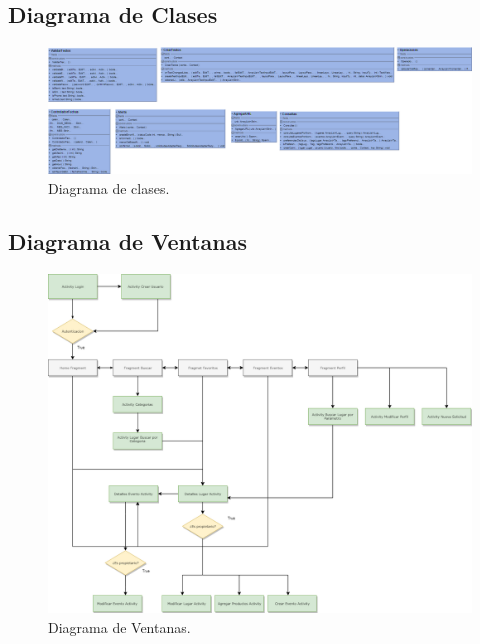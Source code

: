 \documentclass[12pt,letterpaper,openany]{book}
\begin{document}
\subsection{Diagrama de Clases}
\begin{figure}[H]
\begin{center}
\includegraphics[width=16cm]{./imagenes/diagrama_clases}
\caption{Diagrama de clases.}
\end{center}
\end{figure}

\subsection{Diagrama de Ventanas}
\begin{figure}[H]
\begin{center}
\includegraphics[width=13cm]{./imagenes/diagrama_ventanas}
\caption{Diagrama de Ventanas.}
\end{center}
\end{figure}
\end{document}
